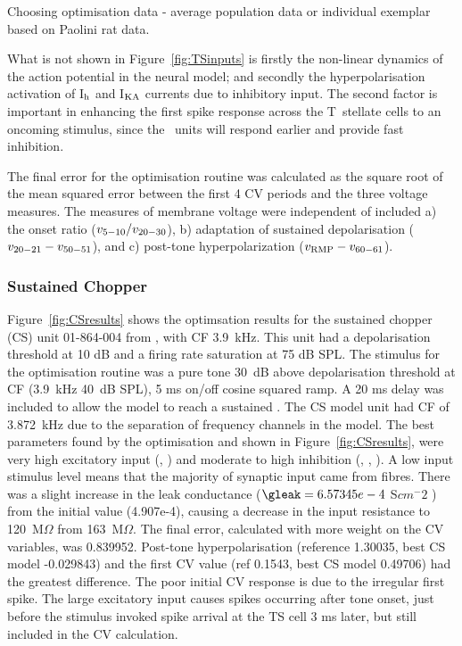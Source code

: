 Choosing optimisation data - average population data or individual exemplar
based on Paolini rat data.


What is not shown in Figure~\ref{fig:TSinputs} is firstly the non-linear dynamics of the action potential in the neural model; and secondly the hyperpolarisation activation of I$_{\rm h}$ and I$_{\rm KA}$ currents due to inhibitory input.
The second factor is important in enhancing the first spike response across the T~stellate cells \citep{PaoliniClareyEtAl:2004} to an oncoming stimulus, since the \OnC~units will respond earlier and provide fast inhibition.


The final error for the optimisation routine was calculated as the square root of the mean squared error between the first 4 CV periods and the three voltage measures.
The measures of membrane voltage were independent of \RMP included a) the onset ratio ($v_{\rm 5-10}/v_{\rm 20-30}$), b) adaptation of sustained depolarisation ($v_{\rm 20-21} - v_{\rm 50-51}$), and c) post-tone hyperpolarization ($v_{\rm RMP} - v_{\rm 60-61}$).


\subsubsection{Sustained Chopper}

Figure~\ref{fig:CSresults} shows the optimsation results for the sustained chopper (CS) unit 01-864-004 from \citep{PaoliniClareyEtAl:2005}, with CF 3.9~kHz.
This unit had a depolarisation threshold at 10 dB and a firing rate saturation at 75 dB SPL.
The stimulus for the optimisation routine was a pure tone 30~dB above depolarisation threshold at CF (3.9~kHz 40~dB SPL), 5 ms on/off cosine squared ramp.
A 20 ms delay was included to allow the model to reach a sustained \RMP. The CS model unit had CF of 3.872~kHz due to the separation of frequency channels in the model.
The best parameters found by the optimisation and shown in Figure~\ref{fig:CSresults}, were very high excitatory input (, ) and moderate to high inhibition (, , ).
A low input stimulus level means that the majority of synaptic input came from \HSR fibres.
There was a slight increase in the leak conductance ($\gleak=6.57345e-4$ S$cm^-2$ ) from the initial value (4.907e-4), causing a decrease in the input resistance to 120~M$\Omega$ from 163~M$\Omega$.
The final error, calculated with more weight on the CV variables, was 0.839952.
Post-tone hyperpolarisation (reference 1.30035, best CS model -0.029843) and the first CV value (ref 0.1543, best CS model 0.49706) had the greatest difference.
The poor initial CV response is due to the irregular first spike.
The large excitatory \HSR input causes spikes occurring after tone onset, just before the stimulus invoked spike arrival at the TS cell 3 ms later, but still included in the CV calculation.


